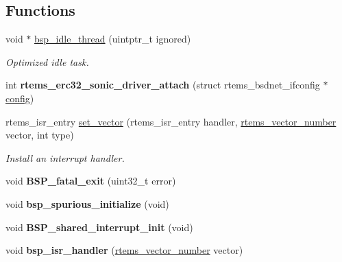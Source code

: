 \subsection*{Functions}
\begin{DoxyCompactItemize}
\item 
void $\ast$ \mbox{\hyperlink{group__RTEMSBSPsSPARCERC32_ga301be7085b80c41a9c5887247003c662}{bsp\+\_\+idle\+\_\+thread}} (uintptr\+\_\+t ignored)
\begin{DoxyCompactList}\small\item\em Optimized idle task. \end{DoxyCompactList}\item 
\mbox{\label{group__RTEMSBSPsSPARCERC32_ga55806c816c771727120e27c69067a786}} 
int {\bfseries rtems\+\_\+erc32\+\_\+sonic\+\_\+driver\+\_\+attach} (struct rtems\+\_\+bsdnet\+\_\+ifconfig $\ast$\mbox{\hyperlink{structconfig__s}{config}})
\item 
rtems\+\_\+isr\+\_\+entry \mbox{\hyperlink{group__RTEMSBSPsSPARCERC32_gab3388042c56b34c40be81fd5f028d97e}{set\+\_\+vector}} (rtems\+\_\+isr\+\_\+entry handler, \mbox{\hyperlink{group__ClassicINTR_ga3e434c197d99f128e78cae4d9358bd8b}{rtems\+\_\+vector\+\_\+number}} vector, int type)
\begin{DoxyCompactList}\small\item\em Install an interrupt handler. \end{DoxyCompactList}\item 
\mbox{\label{group__RTEMSBSPsSPARCERC32_ga9806dc4ebe8d5e4501ace29eb97a8c84}} 
void {\bfseries B\+S\+P\+\_\+fatal\+\_\+exit} (uint32\+\_\+t error)
\item 
\mbox{\label{group__RTEMSBSPsSPARCERC32_gab8c95f338c439b2257bb0f4dc3bc53ae}} 
void {\bfseries bsp\+\_\+spurious\+\_\+initialize} (void)
\item 
\mbox{\label{group__RTEMSBSPsSPARCERC32_ga6069e1c3859da4080ac440883211b2b5}} 
void {\bfseries B\+S\+P\+\_\+shared\+\_\+interrupt\+\_\+init} (void)
\item 
\mbox{\label{group__RTEMSBSPsSPARCERC32_ga6b05ff5e3f13132107c892ff7bfd583d}} 
void {\bfseries bsp\+\_\+isr\+\_\+handler} (\mbox{\hyperlink{group__ClassicINTR_ga3e434c197d99f128e78cae4d9358bd8b}{rtems\+\_\+vector\+\_\+number}} vector)

\end{DoxyCompactItemize}
